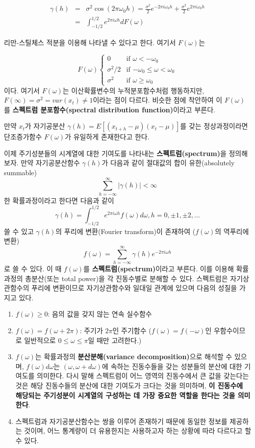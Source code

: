 \documentclass[b5paper,]{book}
\theoremstyle{definition}
\theoremstyle{definition}
\theoremstyle{definition}
\theoremstyle{remark}
\begin{document}
\begin{eqnarray*}
\gamma(h)&=&\sigma^{2}\cos (2\pi \omega_{0}h)=\frac{\sigma^{2}}{2}e^{-2\pi i \omega_{0}h}+\frac{\sigma^{2}}{2}e^{2\pi i \omega_{0}h}\\
&=&\int_{-1/2}^{1/2}e^{2\pi i \omega h }dF(\omega)
\end{eqnarray*}

리만-스틸체스 적분을 이용해 나타낼 수 있다고 한다. 여기서
\(F(\omega)\)는

\[
F(\omega) 
\begin{cases}
0 & \text{if $\omega < -\omega_{0}$}\\
\sigma^{2}/2 & \text{if $-\omega_{0} \leq \omega < \omega_{0}$}\\
\sigma^{2} & \text{if $\omega \geq \omega_{0}$}
\end{cases}
\] 이다. 여기서 \(F(\omega)\)는 이산확률변수의 누적분포함수처럼
행동하지만, \(F(\infty)=\sigma^{2}=var(x_{t})\neq 1\)이라는 점이 다르다.
비슷한 점에 착안하여 이 \(F(\omega)\)를 \textbf{스펙트럼
분포함수(spectral distribution function)}이라고 부른다.

만약 \(x_{t}\)가 자기공분산 \(\gamma(h)=E[(x_{t+h}-\mu)(x_{t}-\mu)]\)를
갖는 정상과정이라면 단조증가함수 \(F(\omega)\)가 유일하게 존재한다고
한다.

이제 주기성분들의 시계열에 대한 기여도를 나타내는
\textbf{스펙트럼(spectrum)}을 정의해보자. 만약 자기공분산함수
\(\gamma(h)\)가 다음과 같이 절대값의 합이 유한(absolutely summable)
\[\sum_{h=-\infty}^{\infty}|\gamma(h)|<\infty\] 한 확률과정이라고 한다면
다음과 같이
\[\gamma(h)=\int_{-1/2}^{1/2}e^{2\pi i \omega h }f(\omega)d\omega, h=0,\pm 1, \pm 2,\ldots\]
쓸 수 있고 \(\gamma(h)\)의 푸리에 변환(Fourier transform)이 존재하여
(\(f(\omega)\)의 역푸리에 변환)
\[f(\omega)=\sum_{h=-\infty}^{\infty}\gamma(h)e^{-2\pi i \omega h}\] 로
쓸 수 있다. 이 때 \(f(\omega)\)를 \textbf{스펙트럼(spectrum)}이라고
부른다. 이를 이용해 확률과정의 총분산(또는 total power)을 각 진동수별로
분해할 수 있다. 스펙트럼은 자기상관함수의 푸리에 변환이므로
자기상관함수와 일대일 관계에 있으며 다음의 성질을 가지고 있다.

\begin{enumerate}
\def\labelenumi{\arabic{enumi}.}
\item
  \(f(\omega)\geq 0\): 음의 값을 갖지 않는 연속 실수함수
\item
  \(f(\omega)=f(\omega + 2\pi)\): 주기가 \(2\pi\)인 주기함수
  (\(f(\omega)=f(-\omega)\)인 우함수이므로 일반적으로
  \(0\leq \omega \leq \pi\)일 때만 고려한다.)
\item
  \(f(\omega)\)는 확률과정의 \textbf{분산분해(variance
  decomposition)}으로 해석할 수 있으며, \(f(\omega)d\omega\)는
  \((\omega, \omega+d\omega)\)에 속하는 진동수들을 갖는 성분들의 분산에
  대한 기여도를 의미한다. 다시 말해 스펙트럼이 어느 영역의 진동수에서 큰
  값을 갖는다는 것은 해당 진동수들의 분산에 대한 기여도가 크다는 것을
  의미하며, \textbf{이 진동수에 해당되는 주기성분이 시계열의 구성하는 데
  가장 중요한 역할을 한다는 것을 의미한다}.
\item
  스펙트럼과 자기공분산함수는 쌍을 이루어 존재하기 때문에 동일한 정보를
  제공하는 것이며, 어느 통계량이 더 유용한지는 사용하고자 하는 상황에
  따라 다르다고 할 수 있다.
\end{enumerate}
\end{document}
